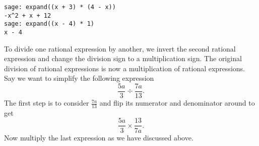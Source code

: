 \begin{lstlisting}
sage: expand((x + 3) * (4 - x))
-x^2 + x + 12
sage: expand((x - 4) * 1)
x - 4
\end{lstlisting}

To divide one rational expression
by another, we invert the second rational expression and change the
division sign to a multiplication sign. The original division of
rational expressions is now a multiplication of rational
expressions. Say we want to simplify the following expression
\[
\frac{5a}{3} \div \frac{7a}{13}.
\]
The first step is to consider $\frac{7a}{13}$ and flip its numerator
and denominator around to get
\[
\frac{5a}{3} \times \frac{13}{7a}.
\]
Now multiply the last expression as we have discussed above.
